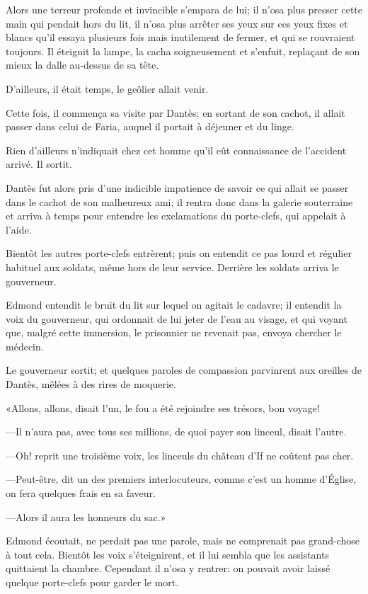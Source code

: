 Alors une terreur profonde et invincible s'empara de lui; il n'osa plus presser cette main qui pendait hors du lit, il n'osa plus arrêter ses yeux sur ces yeux fixes et blancs qu'il essaya plusieurs fois mais inutilement de fermer, et qui se rouvraient toujours. Il éteignit la lampe, la cacha soigneusement et s'enfuit, replaçant de son mieux la dalle au-dessus de sa tête.

D'ailleurs, il était temps, le geôlier allait venir.

Cette fois, il commença sa visite par Dantès; en sortant de son cachot, il allait passer dans celui de Faria, auquel il portait à déjeuner et du linge.

Rien d'ailleurs n'indiquait chez cet homme qu'il eût connaissance de l'accident arrivé. Il sortit.

Dantès fut alors pris d'une indicible impatience de savoir ce qui allait se passer dans le cachot de son malheureux ami; il rentra donc dans la galerie souterraine et arriva à temps pour entendre les exclamations du porte-clefs, qui appelait à l'aide.

Bientôt les autres porte-clefs entrèrent; puis on entendit ce pas lourd et régulier habituel aux soldats, même hors de leur service. Derrière les soldats arriva le gouverneur.

Edmond entendit le bruit du lit sur lequel on agitait le cadavre; il entendit la voix du gouverneur, qui ordonnait de lui jeter de l'eau au visage, et qui voyant que, malgré cette immersion, le prisonnier ne revenait pas, envoya chercher le médecin.

Le gouverneur sortit; et quelques paroles de compassion parvinrent aux oreilles de Dantès, mêlées à des rires de moquerie.

«Allons, allons, disait l'un, le fou a été rejoindre ses trésors, bon voyage!

—Il n'aura pas, avec tous ses millions, de quoi payer son linceul, disait l'autre.

—Oh! reprit une troisième voix, les linceuls du château d'If ne coûtent pas cher.

—Peut-être, dit un des premiers interlocuteurs, comme c'est un homme d'Église, on fera quelques frais en sa faveur.

—Alors il aura les honneurs du sac.»

Edmond écoutait, ne perdait pas une parole, mais ne comprenait pas grand-chose à tout cela. Bientôt les voix s'éteignirent, et il lui sembla que les assistants quittaient la chambre. Cependant il n'osa y rentrer: on pouvait avoir laissé quelque porte-clefs pour garder le mort.

